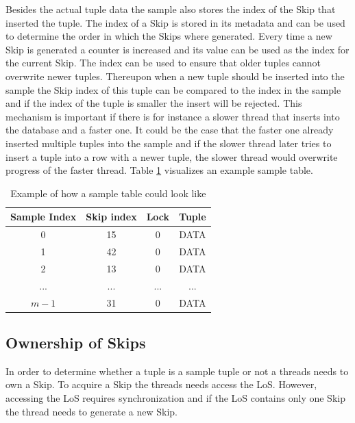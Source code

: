 \documentclass[sigconf,nonacm]{acmart}
\begin{document}
        Besides the actual tuple data the sample also stores the index of the Skip that inserted the tuple. The index of a Skip is stored in its metadata and can be used to determine the order in which the Skips where generated. Every time a new Skip is generated a counter is increased and its value can be used as the index for the current Skip.
        The index can be used to ensure that older tuples cannot overwrite newer tuples. Thereupon when a new tuple should be inserted into the sample the Skip index of this tuple can be compared to the index in the sample and if the index of the tuple is smaller the insert will be rejected. This mechanism is important if there is for instance a slower thread that inserts into the database and a faster one. It could be the case that the faster one already inserted multiple tuples into the sample and if the slower thread later tries to insert a tuple into a row with a newer tuple, the slower thread would overwrite progress of the faster thread. Table \ref{tab:sample} visualizes an example sample table.
        \begin{table}[H]
            \begin{tabular}{| c | c | c | c|} 
                \hline
                Sample Index & Skip index & Lock & Tuple \\
                \hline
                \hline
                0 & 15 & 0 & DATA \\
                \hline
                1 & 42 & 0 & DATA \\
                \hline
                2 & 13 & 0 & DATA \\
                \hline
                ... & ... & ... & ... \\
                \hline
                $m - 1$ & 31 & 0 & DATA \\
                \hline
            \end{tabular}
            \vspace{5mm}
            \caption{Example of how a sample table could look like}
            \label{tab:sample}
        \end{table}

    \subsection{Ownership of Skips}
        In order to determine whether a tuple is a sample tuple or not a threads needs to own a Skip. To acquire a Skip the threads needs access the LoS. However, accessing the LoS requires synchronization and if the LoS contains only one Skip the thread needs to generate a new Skip.
        
\end{document}
